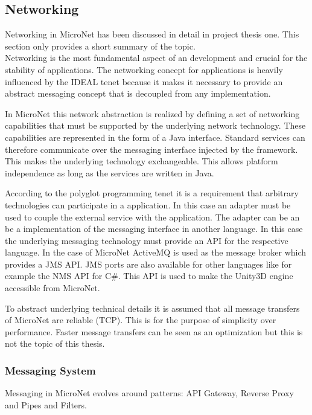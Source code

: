 \subsection{Networking}
Networking in MicroNet has been discussed in detail in project thesis one. This
section only provides a short summary of the topic.\\

Networking is the most fundamental aspect of an \og{} development and crucial
for the stability of \ms{} applications. The networking concept for \ms{}
applications is heavily influenced by the IDEAL tenet because it makes it
necessary to provide an abstract messaging concept that is decoupled from any
implementation.

In MicroNet this network abstraction is realized by defining a set of networking
capabilities that must be supported by the underlying network technology. These
capabilities are represented in the form of a Java interface. Standard services
can therefore communicate over the messaging interface injected by the
framework. This makes the underlying technology exchangeable. This allows
platform independence as long as the services are written in Java.

According to the polyglot programming tenet it is a requirement that arbitrary
technologies can participate in a \ms{} application. In this case an adapter
must be used to couple the external service with the application. The adapter
can be an be a implementation of the messaging interface in another language. In
this case the underlying messaging technology must provide an API for the
respective language. In the case of MicroNet ActiveMQ is used as the
message broker which provides a JMS API. JMS ports are also available for other
languages like for example the NMS API for C\#. This API is used to make the
Unity3D engine accessible from MicroNet.

To abstract underlying technical details it is assumed that all message
transfers of MicroNet are reliable (TCP). This is for the purpose of simplicity
over performance. Faster message transfers can be seen as an optimization but
this is not the topic of this thesis.

\subsubsection{Messaging System}

Messaging in MicroNet evolves around patterns: API Gateway, Reverse Proxy and
Pipes and Filters.\\

